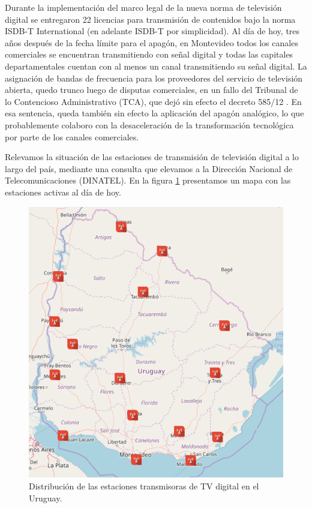 Durante la implementación del marco legal de la nueva norma de televisión digital se entregaron 22 licencias para transmisión de contenidos bajo la norma ISDB-T International (en adelante ISDB-T por simplicidad). Al día de hoy, tres años después de la fecha límite para el apagón, en Montevideo todos los canales comerciales se encuentran transmitiendo con señal digital y todas las capitales departamentales cuentan con al menos un canal transmitiendo su señal digital. 
La asignación de bandas de frecuencia para los proveedores del servicio de televisión abierta, quedo trunco luego de disputas comerciales, en un fallo del Tribunal de lo Contencioso Administrativo (TCA), que dejó sin efecto el decreto 585/12 \cite{cancelacion_decreto_apagon}. En esa sentencia, queda también sin efecto la aplicación del apagón analógico, lo que probablemente colaboro con la desaceleración de la transformación tecnológica por parte de los canales comerciales.

Relevamos la situación de las estaciones de transmisión de televisión digital a lo largo del país, mediante una consulta que elevamos a la Dirección Nacional de Telecomunicaciones (\gls{DINATEL}). En la figura \ref{mapa_estaciones} presentamos un mapa con las estaciones activas al día de hoy.

\begin{figure}
	\centering
	\includegraphics[scale=0.3]{figuras/cap01/mapa_estaciones}
	\caption{\label{mapa_estaciones} Distribución de las estaciones transmisoras de TV digital en el Uruguay.}
\end{figure}

